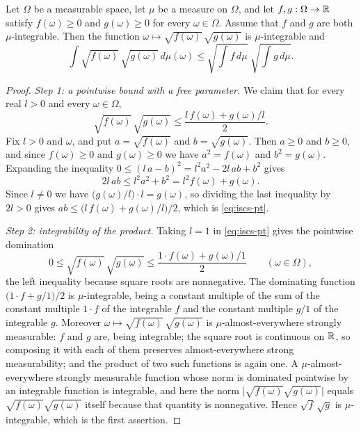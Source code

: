 \begin{lemma}
Let $\Omega$ be a measurable space, let $\mu$ be a measure on $\Omega$, and let
$f,g:\Omega\to\mathbb{R}$ satisfy $f(\omega)\ge0$ and $g(\omega)\ge0$ for every
$\omega\in\Omega$. Assume that $f$ and $g$ are both $\mu$-integrable. Then the
function $\omega\mapsto\sqrt{f(\omega)}\,\sqrt{g(\omega)}$ is $\mu$-integrable
and
\begin{equation}\label{eq:iscs-bound}
  \int\sqrt{f(\omega)}\,\sqrt{g(\omega)}\,d\mu(\omega)
   \le\sqrt{\int f\,d\mu}\;\sqrt{\int g\,d\mu}.
\end{equation}
\end{lemma}
\begin{proof}
\emph{Step 1: a pointwise bound with a free parameter.}
We claim that for every real $l>0$ and every $\omega\in\Omega$,
\begin{equation}\label{eq:iscs-pt}
  \sqrt{f(\omega)}\,\sqrt{g(\omega)}
   \le\frac{l\,f(\omega)+g(\omega)/l}{2}.
\end{equation}
Fix $l>0$ and $\omega$, and put $a=\sqrt{f(\omega)}$ and $b=\sqrt{g(\omega)}$.
Then $a\ge0$ and $b\ge0$, and since $f(\omega)\ge0$ and $g(\omega)\ge0$ we have
$a^2=f(\omega)$ and $b^2=g(\omega)$. Expanding the inequality
$0\le(l\,a-b)^2=l^2a^2-2l\,ab+b^2$ gives
\[
  2l\,ab\le l^2a^2+b^2=l^2f(\omega)+g(\omega).
\]
Since $l\ne0$ we have $\bigl(g(\omega)/l\bigr)\cdot l=g(\omega)$, so dividing
the last inequality by $2l>0$ gives
$ab\le\bigl(l\,f(\omega)+g(\omega)/l\bigr)/2$, which is \eqref{eq:iscs-pt}.

\emph{Step 2: integrability of the product.}
Taking $l=1$ in \eqref{eq:iscs-pt} gives the pointwise domination
\[
  0\le\sqrt{f(\omega)}\,\sqrt{g(\omega)}
   \le\frac{1\cdot f(\omega)+g(\omega)/1}{2}
   \qquad(\omega\in\Omega),
\]
the left inequality because square roots are nonnegative. The dominating
function $\bigl(1\cdot f+g/1\bigr)/2$ is $\mu$-integrable, being a constant
multiple of the sum of the constant multiple $1\cdot f$ of the integrable $f$
and the constant multiple $g/1$ of the integrable $g$. Moreover
$\omega\mapsto\sqrt{f(\omega)}\,\sqrt{g(\omega)}$ is $\mu$-almost-everywhere
strongly measurable: $f$ and $g$ are, being integrable; the square root is
continuous on $\mathbb{R}$, so composing it with each of them preserves almost-everywhere
strong measurability; and the product of two such functions is again one. A
$\mu$-almost-everywhere strongly measurable function whose norm is dominated
pointwise by an integrable function is integrable, and here the norm
$\bigl|\sqrt{f(\omega)}\sqrt{g(\omega)}\bigr|$ equals
$\sqrt{f(\omega)}\sqrt{g(\omega)}$ itself because that quantity is nonnegative.
Hence $\sqrt f\,\sqrt g$ is $\mu$-integrable, which is the first assertion.


\end{proof}
